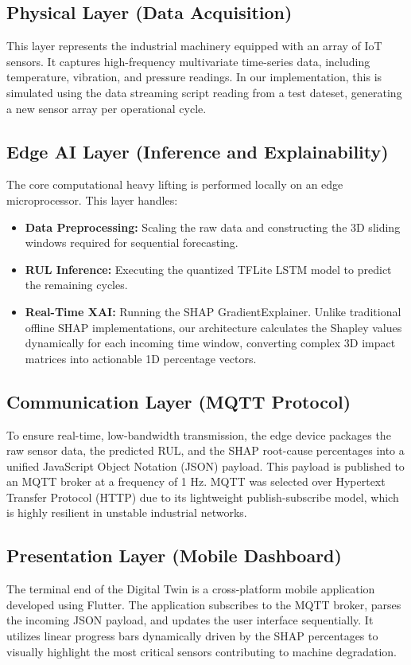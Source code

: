 \documentclass[journal]{IEEEtran}
\begin{document}
\subsection{Physical Layer (Data Acquisition)}
This layer represents the industrial machinery equipped with an array of IoT sensors. It captures high-frequency multivariate time-series data, including temperature, vibration, and pressure readings. In our implementation, this is simulated using the data streaming script reading from a test dateset, generating a new sensor array per operational cycle.

\subsection{Edge AI Layer (Inference and Explainability)}
The core computational heavy lifting is performed locally on an edge microprocessor. This layer handles:
\begin{itemize}
    \item \textbf{Data Preprocessing:} Scaling the raw data and constructing the 3D sliding windows required for sequential forecasting.
    \item \textbf{RUL Inference:} Executing the quantized TFLite LSTM model to predict the remaining cycles.
    \item \textbf{Real-Time XAI:} Running the SHAP GradientExplainer. Unlike traditional offline SHAP implementations, our architecture calculates the Shapley values dynamically for each incoming time window, converting complex 3D impact matrices into actionable 1D percentage vectors.
\end{itemize}

\subsection{Communication Layer (MQTT Protocol)}
To ensure real-time, low-bandwidth transmission, the edge device packages the raw sensor data, the predicted RUL, and the SHAP root-cause percentages into a unified JavaScript Object Notation (JSON) payload. This payload is published to an MQTT broker at a frequency of 1 Hz. MQTT was selected over Hypertext Transfer Protocol (HTTP) due to its lightweight publish-subscribe model, which is highly resilient in unstable industrial networks.

\subsection{Presentation Layer (Mobile Dashboard)}
The terminal end of the Digital Twin is a cross-platform mobile application developed using Flutter. The application subscribes to the MQTT broker, parses the incoming JSON payload, and updates the user interface sequentially. It utilizes linear progress bars dynamically driven by the SHAP percentages to visually highlight the most critical sensors contributing to machine degradation.
\end{document}
